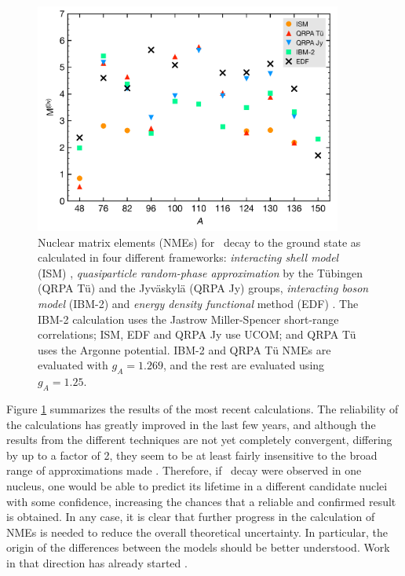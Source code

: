 \documentclass{PoS}
\begin{document}
\begin{figure}
\centering
\includegraphics[width=0.9\textwidth]{img/NME.pdf}
\caption{Nuclear matrix elements (NMEs) for \bbonu\ decay to the ground state as calculated in four different frameworks: \emph{interacting shell model} (ISM) \cite{Menendez:2008jp}, \emph{quasiparticle random-phase approximation} by the T\"ubingen (QRPA T\"u) \cite{Simkovic:2013qiy} and the Jyv\"askyl\"a (QRPA Jy) \cite{Suhonen:2012ii} groups, \emph{interacting boson model} (IBM-2) \cite{Barea:2013bz} and \emph{energy density functional} method (EDF) \cite{Vaquero:2014dna}. 
The IBM-2 calculation uses the Jastrow Miller-Spencer short-range correlations; ISM, EDF and QRPA Jy use UCOM; and QRPA T\"u uses the Argonne potential. 
IBM-2 and QRPA T\"u NMEs are evaluated with $g_{A}=1.269$, and the rest are evaluated using $g_{A}=1.25$.}\label{fig:NME}
\end{figure}

Figure \ref{fig:NME} summarizes the results of the most recent calculations. The reliability of the calculations has greatly improved in the last few years, and although the results from the different techniques are not yet completely convergent, differing by up to a factor of 2, they seem to be at least fairly insensitive to the broad range of approximations made \cite{Vogel:2012ja}. Therefore, if \bbonu\ decay were observed in one nucleus, one would be able to predict its lifetime in a different candidate nuclei with some confidence, increasing the chances that a reliable and confirmed result is obtained. In any case, it is clear that further progress in the calculation of NMEs is needed to reduce the overall theoretical uncertainty. In particular, the origin of the differences between the models should be better understood. Work in that direction has already started \cite{Menendez:2014ena}.
\end{document}
